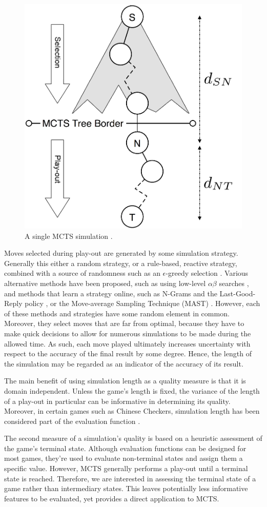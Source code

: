 \documentclass{ecai2014}
\begin{document}
\begin{figure}[t]
	\centering
	\includegraphics[width=.3\textwidth]{img/figure2_new.png}
	\caption{A single MCTS simulation \cite{finnsson2010learning}.}
	\label{fig:mcts-simulation}
\end{figure}

Moves selected during play-out are generated by some simulation strategy. Generally this either a random strategy, or a rule-based, reactive strategy, combined with a source of randomness such as an $\epsilon$-greedy selection \cite{sturtevant2008analysis,sutton1998reinforcement}. Various alternative methods have been proposed, such as using low-level $\alpha\beta$ searches \cite{Winands2011}, and methods that learn a strategy online, such as N-Grams and the Last-Good-Reply policy \cite{Tak2012}, or the Move-average Sampling Technique (MAST) \cite{finnsson2008simulation}. However, each of these methods and strategies have some random element in common. Moreover, they select moves that are far from optimal, because they have to make quick decisions to allow for numerous simulations to be made during the allowed time. As such, each move played ultimately increases uncertainty with respect to the accuracy of the final result by some degree. Hence, the length of the simulation may be regarded as an indicator of the accuracy of its result.

The main benefit of using simulation length as a quality measure is that it is domain independent. Unless the game's length is fixed, the variance of the length of a play-out in particular can be informative in determining its quality. Moreover, in certain games such as Chinese Checkers, simulation length has been considered part of the evaluation function \cite{roschke2013cc}.

The second measure of a simulation's quality is based on a heuristic assessment of the game's terminal state. Although evaluation functions can be designed for most games, they're used to evaluate non-terminal states and assign them a specific value. However, MCTS generally performs a play-out until a terminal state is reached. Therefore, we are interested in assessing the terminal state of a game rather than intermediary states. This leaves potentially less informative features to be evaluated, yet provides a direct application to MCTS.
\end{document}
